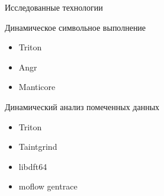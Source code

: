 \documentclass[10pt]{beamer}
\begin{document}

\begin{frame}{Исследованные технологии}
  \begin{block}{Динамическое символьное выполнение}
    \begin{itemize}
      \item Triton
      \item Angr
      \item Manticore
    \end{itemize}
  \end{block}
    \begin{block}{Динамический анализ помеченных данных}
    \begin{itemize}
      \item Triton 
      \item Taintgrind
      \item libdft64
      \item moflow gentrace
    \end{itemize}
  \end{block}
\end{frame}
\end{document}
